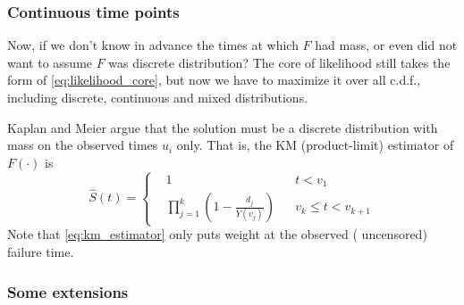 \documentclass[a4paper,12pt]{article}
\begin{document}
\subsubsection{Continuous time points}
\label{sec:cont-time-points}

Now, if we don't know in advance the times at which $F$ had mass, or even did not want to assume $F$ was discrete distribution? The core of likelihood still takes the form of \eqref{eq:likelihood_core}, but now we have to maximize it over all c.d.f., including discrete, continuous and mixed distributions.
\par
Kaplan and Meier argue that the solution must be a discrete distribution with mass on the observed times $u_i$ only. That is, the KM (product-limit) estimator of $F\left(\cdot\right)$ is
\begin{equation}
  \label{eq:km_estimator}
  \hat{S}\left(t\right) =\left\{
  \begin{aligned}    
    & 1 && t < v_1    \\
    & \prod\limits_{j = 1}^{k}
      \left(1 - \frac{d_j}{Y\left(v_j\right)}\right) && v_{k} \leq t < v_{k + 1}
  \end{aligned}
  \right.  
\end{equation}
Note that \eqref{eq:km_estimator} only puts weight at the observed ({\color{red} uncensored}) failure time.

\subsubsection{Some extensions}
\label{sec:some-extensions}




\end{document}
